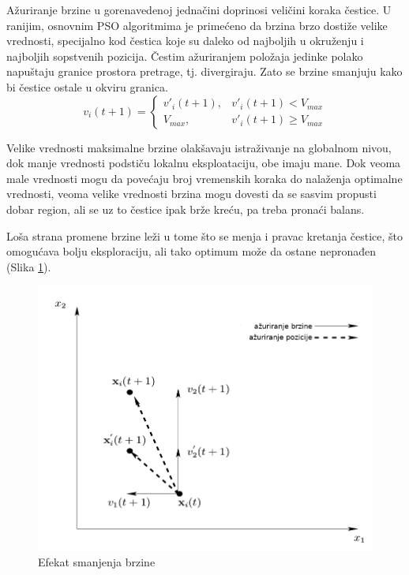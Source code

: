 \documentclass[a4paper]{article}
\begin{document}
Ažuriranje brzine u gorenavedenoj jednačini doprinosi veličini koraka čestice. U ranijim, osnovnim PSO algoritmima je primećeno da brzina brzo dostiže velike vrednosti, specijalno kod čestica koje su daleko od najboljih u okruženju i najboljih sopstvenih pozicija. Čestim ažuriranjem položaja jedinke polako napuštaju granice prostora pretrage, tj. divergiraju. Zato se brzine smanjuju kako bi čestice ostale u okviru granica.
\begin{equation}
    v_i(t+1) = \begin{cases}
                
            v'_i(t+1),  &  v'_i(t+1) < V_{max}\\
            V_{max},  &   v'_i(t+1) \geq V_{max}
           
             \end{cases}
\end{equation}

Velike vrednosti maksimalne brzine olakšavaju istraživanje na globalnom nivou, dok manje vrednosti podstiču lokalnu eksploataciju, obe imaju mane. Dok veoma male vrednosti mogu da povećaju broj vremenskih koraka do nalaženja optimalne vrednosti, veoma velike vrednosti brzina mogu dovesti da se sasvim propusti dobar region, ali se uz to čestice ipak brže kreću, pa treba pronaći balans.

Loša strana promene brzine leži u tome što se menja i pravac kretanja čestice, što omogućava bolju eksploraciju, ali tako optimum može da ostane nepronađen (Slika \ref{fig:smanjenje_brzina}).

\begin{figure}[htp]
    \centering
    \includegraphics[scale=0.23]{slika3_1.png}
    \caption{Efekat smanjenja brzine}
    \label{fig:smanjenje_brzina}
\end{figure}
\end{document}
